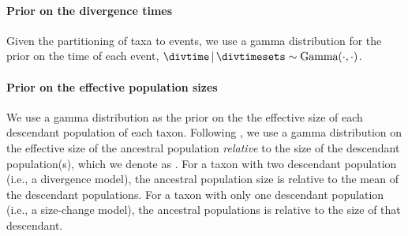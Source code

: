\begin{linenomath}
\paragraph{Prior on the divergence times}
Given the partitioning of taxa to events, we use a gamma
distribution for the prior on the time of each event,
$\divtime \given \divtimesets \sim \distgamma(\cdot, \cdot)$.

\paragraph{Prior on the effective population sizes}
We use a gamma distribution as the prior on the 
the effective size of each descendant population of each taxon.
Following \citet{Oaks2018ecoevolity},
we use a gamma distribution on the effective size of the ancestral population
\emph{relative} to the size of the descendant population(s), which we
denote as \rootrelativepopsize.
For a taxon with two descendant population (i.e., a divergence model), the
ancestral population size is relative to the mean of the descendant
populations.
For a taxon with only one descendant population (i.e., a size-change model),
the ancestral populations is relative to the size of that descendant.


\end{linenomath}
